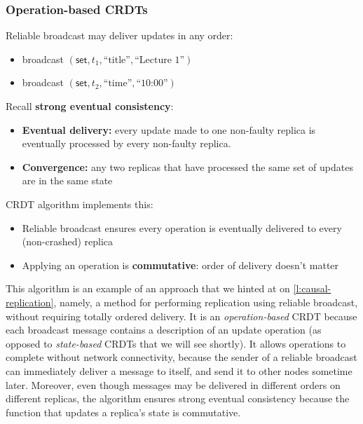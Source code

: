 \begin{frame}
    \label{s:op-crdt}
    \frametitle{Operation-based CRDTs}
    Reliable broadcast may deliver updates in any order:
    \begin{itemize}
        \item broadcast $(\mathsf{set}, t_1, \text{``title''}, \text{``Lecture 1''})$
        \item broadcast $(\mathsf{set}, t_2, \text{``time''}, \text{``10:00''})$\\[1em]\pause
    \end{itemize}
    Recall \textbf{strong eventual consistency}:
    \begin{itemize}
        \item \textbf{Eventual delivery:} every update made to one non-faulty replica is eventually processed by every non-faulty replica.
        \item \textbf{Convergence:} any two replicas that have processed the same set of updates are in the same state\\[1em]\pause
    \end{itemize}
    CRDT algorithm implements this:
    \begin{itemize}
        \item Reliable broadcast ensures every operation is eventually delivered to every (non-crashed) replica\pause
        \item Applying an operation is \textbf{commutative}: order of delivery doesn't matter
    \end{itemize}
\end{frame}
\label{l:op-crdt}

This algorithm is an example of an approach that we hinted at on \autoref{l:causal-replication}, namely, a method for performing replication using reliable broadcast, without requiring totally ordered delivery.
It is an \emph{operation-based} CRDT because each broadcast message contains a description of an update operation (as opposed to \emph{state-based} CRDTs that we will see shortly).
It allows operations to complete without network connectivity, because the sender of a reliable broadcast can immediately deliver a message to itself, and send it to other nodes sometime later.
Moreover, even though messages may be delivered in different orders on different replicas, the algorithm ensures strong eventual consistency because the function that updates a replica's state is commutative.

